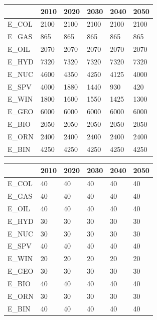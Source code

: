 \documentclass[10pt,a4paper,titlepage,dvipdfmx]{book}
\begin{document}
\begin{itemize}
\begin{tabularx}{\textwidth}{|
p{}|
p{}|
p{}|
p{}|
p{}|
p{}|} 
\caption{\label{tab:IniInvCos}Initial investment cost (\$/MW)} \\
\hline 
  & 2010 & 2020 & 2030 & 2040 & 2050 \\\hline 
E\_COL & 2100 & 2100 & 2100 & 2100 & 2100 \\\hline 
E\_GAS & 865 & 865 & 865 & 865 & 865 \\\hline 
E\_OIL & 2070 & 2070 & 2070 & 2070 & 2070 \\\hline 
E\_HYD & 7320 & 7320 & 7320 & 7320 & 7320 \\\hline 
E\_NUC & 4600 & 4350 & 4250 & 4125 & 4000 \\\hline 
E\_SPV & 4000 & 1880 & 1440 & 930 & 420 \\\hline 
E\_WIN & 1800 & 1600 & 1550 & 1425 & 1300 \\\hline 
E\_GEO & 6000 & 6000 & 6000 & 6000 & 6000 \\\hline 
E\_BIO & 2050 & 2050 & 2050 & 2050 & 2050 \\\hline 
E\_ORN & 2400 & 2400 & 2400 & 2400 & 2400 \\\hline 
E\_BIN & 4250 & 4250 & 4250 & 4250 & 4250 \\\hline 
\end{tabularx}

\begin{tabularx}{\textwidth}{|
p{}|
p{}|
p{}|
p{}|
p{}|
p{}|}
\caption{\label{tab:LifTim}Life time (year)} \\
 \hline 
  & 2010 & 2020 & 2030 & 2040 & 2050 \\\hline 
E\_COL & 40 & 40 & 40 & 40 & 40 \\\hline 
E\_GAS & 40 & 40 & 40 & 40 & 40 \\\hline 
E\_OIL & 40 & 40 & 40 & 40 & 40 \\\hline 
E\_HYD & 30 & 30 & 30 & 30 & 30 \\\hline 
E\_NUC & 30 & 30 & 30 & 30 & 30 \\\hline 
E\_SPV & 40 & 40 & 40 & 40 & 40 \\\hline 
E\_WIN & 20 & 20 & 20 & 20 & 20 \\\hline 
E\_GEO & 30 & 30 & 30 & 30 & 30 \\\hline 
E\_BIO & 40 & 40 & 40 & 40 & 40 \\\hline 
E\_ORN & 30 & 30 & 30 & 30 & 30 \\\hline 
E\_BIN & 40 & 40 & 40 & 40 & 40 \\\hline 
\end{tabularx}


\end{itemize}
\end{document}
